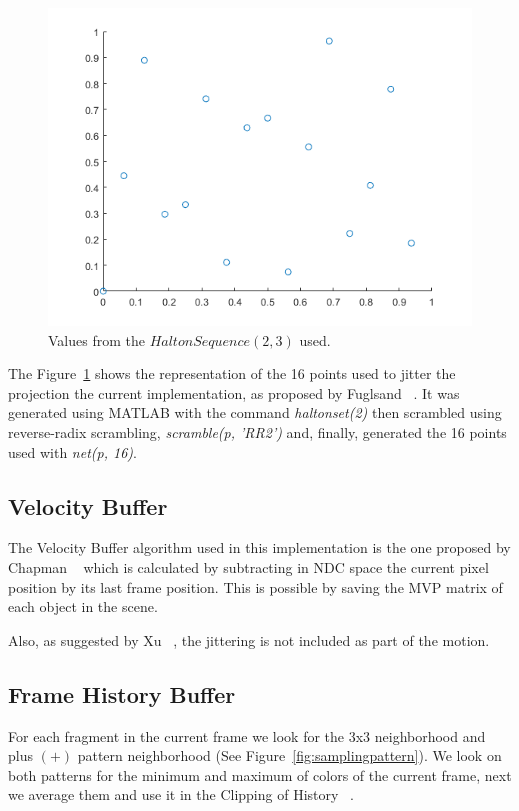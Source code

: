 \documentclass{cslthse-msc}
\begin{document}
\begin{figure}[!hbt]
	\centering
	\includegraphics[scale=0.5]{images/halton_16.png}
	\caption{Values from the \(Halton Sequence (2,3)\) used.}\label{fig:halton16}
\end{figure}

The Figure~\ref{fig:halton16} shows the representation of the 16 points used to jitter the projection the current implementation, as proposed by Fuglsand ~\cite{Fuglsand2016}. It was generated using MATLAB with the command \emph{haltonset(2)} then scrambled using reverse-radix scrambling, \emph{scramble(p, 'RR2')} and, finally, generated the 16 points used with \emph{net(p, 16)}.

\subsection{Velocity Buffer}
The Velocity Buffer algorithm used in this implementation is the one proposed by Chapman ~\cite{Chapman2012} which is calculated by subtracting in NDC space the current pixel position by its last frame position. This is possible by saving the MVP matrix of each object in the scene.

Also, as suggested by Xu ~\cite{XU2016}, the jittering is not included as part of the motion.


\subsection{Frame History Buffer}
For each fragment in the current frame we look for the 3x3 neighborhood and plus \((+)\) pattern neighborhood (See Figure~\ref{fig:samplingpattern}). We look on both patterns for the minimum and maximum of colors of the current frame, next we average them and use it in the Clipping of History ~\cite{Fuglsand2016}.
\end{document}
